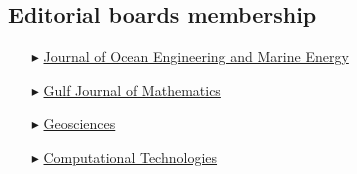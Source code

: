 \separator
\subsection{Editorial boards membership}

\begin{itemize}

  \item[$\blacktriangleright$] \href{https://www.springer.com/engineering/civil+engineering/journal/40722}{Journal of Ocean Engineering and Marine Energy}
  \item[$\blacktriangleright$] \href{https://gjom.org/index.php/gjom}{Gulf Journal of Mathematics}
  \item[$\blacktriangleright$] \href{https://www.mdpi.com/journal/geosciences/}{Geosciences}
  \item[$\blacktriangleright$] \href{http://www.ict.nsc.ru/jct/}{Computational Technologies}
  
\end{itemize}